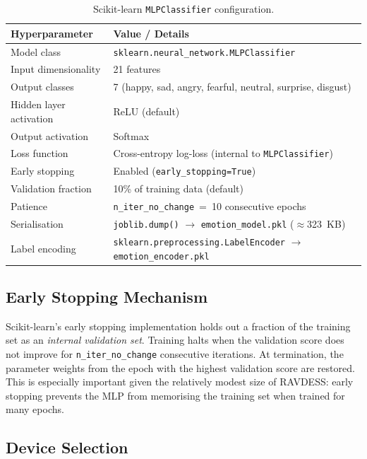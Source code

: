 \documentclass[12pt,a4paper]{article}
\begin{document}
\begin{table}[H]
\centering
\caption{Scikit-learn \texttt{MLPClassifier} configuration.}
\label{tab:mlp}
\begin{tabular}{ll}
\toprule
\textbf{Hyperparameter} & \textbf{Value / Details} \\
\midrule
Model class & \texttt{sklearn.neural\_network.MLPClassifier} \\
Input dimensionality & 21 features \\
Output classes & 7 (happy, sad, angry, fearful, neutral, surprise, disgust) \\
Hidden layer activation & ReLU (default) \\
Output activation & Softmax \\
Loss function & Cross-entropy log-loss (internal to \texttt{MLPClassifier}) \\
Early stopping & Enabled (\texttt{early\_stopping=True}) \\
Validation fraction & 10\% of training data (default) \\
Patience & \texttt{n\_iter\_no\_change}~=~10 consecutive epochs \\
Serialisation & \texttt{joblib.dump()} $\rightarrow$ \texttt{emotion\_model.pkl} ($\approx$323~KB) \\
Label encoding & \texttt{sklearn.preprocessing.LabelEncoder} $\rightarrow$ \texttt{emotion\_encoder.pkl} \\
\bottomrule
\end{tabular}
\end{table}

\subsection{Early Stopping Mechanism}

Scikit-learn's early stopping implementation holds out a fraction of the
training set as an \textit{internal validation set}. Training halts when
the validation score does not improve for \texttt{n\_iter\_no\_change}
consecutive iterations. At termination, the parameter weights from the
epoch with the highest validation score are restored. This is especially
important given the relatively modest size of RAVDESS: early stopping
prevents the MLP from memorising the training set when trained for many
epochs.

\subsection{Device Selection}
\end{document}
